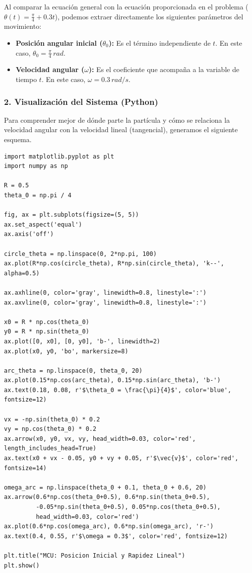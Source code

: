 \documentclass[12pt, a4paper]{article}
\begin{document}
Al comparar la ecuación general con la ecuación proporcionada en el problema ($\theta(t) = \frac{\pi}{4} + 0.3 t$), podemos extraer directamente los siguientes parámetros del movimiento:
\begin{itemize}
    \item \textbf{Posición angular inicial ($\theta_0$):} Es el término independiente de $t$. En este caso, $\theta_0 = \frac{\pi}{4} \, \si{rad}$.
    \item \textbf{Velocidad angular ($\omega$):} Es el coeficiente que acompaña a la variable de tiempo $t$. En este caso, $\omega = 0.3 \, \si{rad/s}$.
\end{itemize}

\subsubsection*{2. Visualización del Sistema (Python)}
Para comprender mejor de dónde parte la partícula y cómo se relaciona la velocidad angular con la velocidad lineal (tangencial), generamos el siguiente esquema.

\begin{lstlisting}
import matplotlib.pyplot as plt
import numpy as np

R = 0.5
theta_0 = np.pi / 4

fig, ax = plt.subplots(figsize=(5, 5))
ax.set_aspect('equal')
ax.axis('off')

circle_theta = np.linspace(0, 2*np.pi, 100)
ax.plot(R*np.cos(circle_theta), R*np.sin(circle_theta), 'k--', alpha=0.5)

ax.axhline(0, color='gray', linewidth=0.8, linestyle=':')
ax.axvline(0, color='gray', linewidth=0.8, linestyle=':')

x0 = R * np.cos(theta_0)
y0 = R * np.sin(theta_0)
ax.plot([0, x0], [0, y0], 'b-', linewidth=2)
ax.plot(x0, y0, 'bo', markersize=8)

arc_theta = np.linspace(0, theta_0, 20)
ax.plot(0.15*np.cos(arc_theta), 0.15*np.sin(arc_theta), 'b-')
ax.text(0.18, 0.08, r'$\theta_0 = \frac{\pi}{4}$', color='blue', fontsize=12)

vx = -np.sin(theta_0) * 0.2
vy = np.cos(theta_0) * 0.2
ax.arrow(x0, y0, vx, vy, head_width=0.03, color='red', length_includes_head=True)
ax.text(x0 + vx - 0.05, y0 + vy + 0.05, r'$\vec{v}$', color='red', fontsize=14)

omega_arc = np.linspace(theta_0 + 0.1, theta_0 + 0.6, 20)
ax.arrow(0.6*np.cos(theta_0+0.5), 0.6*np.sin(theta_0+0.5), 
         -0.05*np.sin(theta_0+0.5), 0.05*np.cos(theta_0+0.5), 
         head_width=0.03, color='red')
ax.plot(0.6*np.cos(omega_arc), 0.6*np.sin(omega_arc), 'r-')
ax.text(0.4, 0.55, r'$\omega = 0.3$', color='red', fontsize=12)

plt.title("MCU: Posicion Inicial y Rapidez Lineal")
plt.show()
\end{lstlisting}
\end{document}
